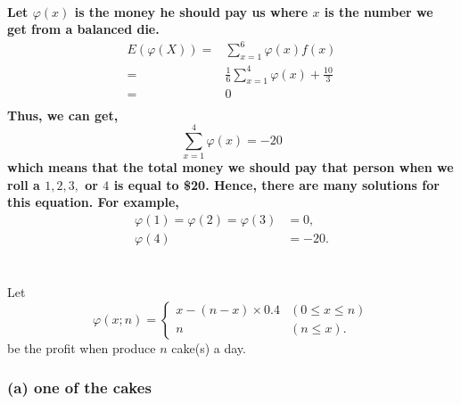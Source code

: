 \documentclass{article}
\begin{document}
        \paragraph{
            Let $\varphi(x)$ is the money he should pay us where $x$ is the number we get from a balanced die.
            \begin{equation*}
                \begin{split}
                    E(\varphi(X))=&\sum _{x=1} ^6 \varphi(x)f(x)\\
                        =&\frac{1}{6}\sum_{x=1} ^4 \varphi(x)+\frac{10}{3}\\
                        =&0\\
                \end{split}
            \end{equation*}
            Thus, we can get,
            $$\sum _{x=1} ^4 \varphi(x)=-20$$
            which means that the total money we should pay that person when we roll a $1,2,3,$ or $4$ is equal to \$20. Hence, there are many solutions for this equation. For example,
            \begin{equation*}
                \begin{split}
                    \varphi(1)=\varphi(2)=\varphi(3)&=0,\\
                    \varphi(4)&=-20.
                \end{split}
            \end{equation*}
        }
    

    \section{}
        \subsection{}
            Let 
            \begin{equation*}
                \varphi(x;n)=
                \begin{cases}
                    x-(n-x)\times 0.4 & (0\leq x\leq n)\\
                    n& (n\leq x).
                \end{cases}
            \end{equation*}
            be the profit when produce $n$ cake(s) a day.

            \subsubsection*{(a) one of the cakes}
\end{document}
